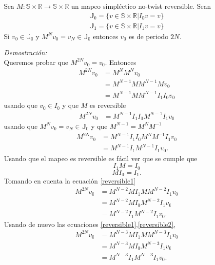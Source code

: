 \begin{thm}
Sea $M:\mathbb{S} \times \mathbb{R} \longrightarrow \mathbb{S}\times\mathbb{R}$ un mapeo simpl\'ectico no-twist reversible. Sean 
\begin{eqnarray}
\mathbb{J}_{0} = \{v \in \mathbb{S} \times \mathbb{R} | I_{0}v = v\}
\end{eqnarray}
\begin{eqnarray}
\mathbb{J}_{1} = \{v \in \mathbb{S} \times \mathbb{R} | I_{1}v = v\}
\end{eqnarray}
Si $v_{0}\in \mathbb{J}_{0}$ y $M^{N}v_{0}=v_{N}\in \mathbb{J}_{0}$ entonces $v_{0}$ es de periodo $2N$.
\end{thm}
\textit{Demostraci\'on:}\\
Queremos probar que $M^{2N}v_{0}=v_{0}$. Entonces
\begin{align*}
	M^{2N}v_{0} &= M^{N}M^{N}v_{0}\\
				&= M^{N-1}MM^{N-1}Mv_{0}\\
				&= M^{N-1}MM^{N-1}I_{1}I_{0}v_{0}
\end{align*}
usando que $v_{0}\in I_{0}$ y que $M$ es reversible
\begin{align*}
	M^{2N}v_{0} &= M^{N-1}I_{1}I_{0}M^{N-1}I_{1}v_{0}
\end{align*}
usando que $M^{N}v_{0}=v_{N}\in \mathbb{J}_{0}$ y que $M^{N-1}=M^{N}M^{-1}$
\begin{align*}
	M^{2N}v_{0} &= M^{N-1}I_{1}I_{0}M^{N}M^{-1}I_{1}v_{0}\\
				&= M^{N-1}I_{1}	M^{N-1}I_{1}v_{0}.
\end{align*}
Usando que el mapeo es reversible es f\'acil ver que se cumple que
\begin{equation}
I_{1}M=I_{0}
\label{reversible1}
\end{equation}
\begin{equation}
MI_{0} = I_{1}.
\label{reversible2}
\end{equation}
Tomando en cuenta la ecuaci\'on \ref{reversible1}
\begin{align*}
M^{2N}v_{0} &= M^{N-2}MI_{1}MM^{N-2}I_{1}v_{0} \\
			&= M^{N-2}MI_{0}M^{N-2}I_{1}v_{0}\\
			&= M^{N-2}I_{1}M^{N-2}I_{1}v_{0}.
\end{align*}
Usando de nuevo las ecuaciones \ref{reversible1},\ref{reversible2},
\begin{align*}
M^{2N}v_{0} &= M^{N-3}MI_{1}MM^{N-3}I_{1}v_{0} \\
			&= M^{N-3}MI_{0}M^{N-3}I_{1}v_{0}\\
			&= M^{N-3}I_{1}M^{N-3}I_{1}v_{0}.
\end{align*}

